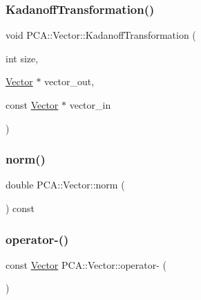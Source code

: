 \hypertarget{class_p_c_a_1_1_vector_a385f07b1056ab2a7648b0b9dd03cd8b0}{}\label{class_p_c_a_1_1_vector_a385f07b1056ab2a7648b0b9dd03cd8b0} 
\subsubsection{\texorpdfstring{Kadanoff\+Transformation()}{KadanoffTransformation()}}
{\footnotesize\ttfamily void P\+C\+A\+::\+Vector\+::\+Kadanoff\+Transformation (\begin{DoxyParamCaption}\item[{int}]{size,  }\item[{\hyperlink{class_p_c_a_1_1_vector}{Vector} $\ast$}]{vector\+\_\+out,  }\item[{const \hyperlink{class_p_c_a_1_1_vector}{Vector} $\ast$}]{vector\+\_\+in }\end{DoxyParamCaption})\hspace{0.3cm}{\ttfamily [static]}}

\hypertarget{class_p_c_a_1_1_vector_a709eef286197f64e45f35fce0925ddf0}{}\label{class_p_c_a_1_1_vector_a709eef286197f64e45f35fce0925ddf0} 
\subsubsection{\texorpdfstring{norm()}{norm()}}
{\footnotesize\ttfamily double P\+C\+A\+::\+Vector\+::norm (\begin{DoxyParamCaption}{ }\end{DoxyParamCaption}) const\hspace{0.3cm}{\ttfamily [inline]}}

\hypertarget{class_p_c_a_1_1_vector_ac94bf46625448a0ece199c2021993e6c}{}\label{class_p_c_a_1_1_vector_ac94bf46625448a0ece199c2021993e6c} 
\subsubsection{\texorpdfstring{operator-\/()}{operator-()}}
{\footnotesize\ttfamily const \hyperlink{class_p_c_a_1_1_vector}{Vector} P\+C\+A\+::\+Vector\+::operator-\/ (\begin{DoxyParamCaption}{ }\end{DoxyParamCaption})\hspace{0.3cm}{\ttfamily [inline]}}

